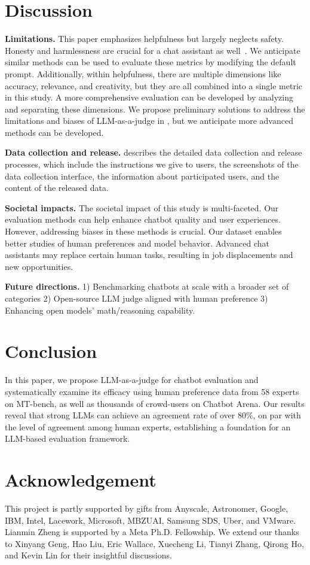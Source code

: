 \section{Discussion}
\label{sec:discussion}

\textbf{Limitations.}
This paper emphasizes helpfulness but largely neglects safety. Honesty and harmlessness are crucial for a chat assistant as well~\cite{bai2022training}. We anticipate similar methods can be used to evaluate these metrics by modifying the default prompt. Additionally, within helpfulness, there are multiple dimensions like accuracy, relevance, and creativity, but they are all combined into a single metric in this study. A more comprehensive evaluation can be developed by analyzing and separating these dimensions. 
We propose preliminary solutions to address the limitations and biases of LLM-as-a-judge in , but we anticipate more advanced methods can be developed.



\textbf{Data collection and release.}
 describes the detailed data collection and release processes, which include the instructions we give to users, the screenshots of the data collection interface, the information about participated users, and the content of the released data.

\textbf{Societal impacts.}
The societal impact of this study is multi-faceted. Our evaluation methods can help enhance chatbot quality and user experiences. However, addressing biases in these methods is crucial. Our dataset enables better studies of human preferences and model behavior. Advanced chat assistants may replace certain human tasks, resulting in job displacements and new opportunities.

\textbf{Future directions.}
1) Benchmarking chatbots at scale with a broader set of categories 2) Open-source LLM judge aligned with human preference 3) Enhancing open models' math/reasoning capability.

\section{Conclusion}
\label{sec:conclusion}
In this paper, we propose LLM-as-a-judge for chatbot evaluation and systematically examine its efficacy using human preference data from 58 experts on MT-bench, as well as thousands of crowd-users on Chatbot Arena.
Our results reveal that strong LLMs can achieve an agreement rate of over 80\%, on par with the level of agreement among human experts, establishing a foundation for an LLM-based evaluation framework.

\section*{Acknowledgement}
This project is partly supported by gifts from Anyscale, Astronomer, Google, IBM, Intel, Lacework, Microsoft, MBZUAI, Samsung SDS, Uber, and VMware. Lianmin Zheng is supported by a Meta Ph.D. Fellowship.
We extend our thanks to Xinyang Geng, Hao Liu, Eric Wallace, Xuecheng Li, Tianyi Zhang, Qirong Ho, and Kevin Lin for their insightful discussions.


